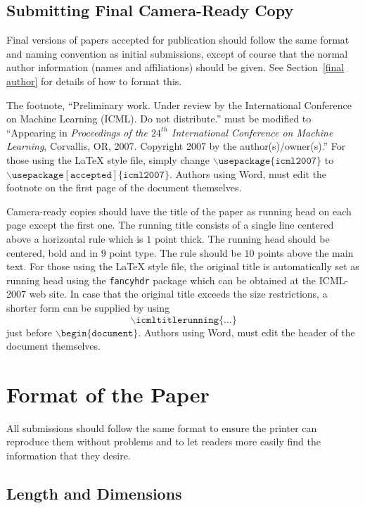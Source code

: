 \documentclass{article}
\begin{document}
\subsection{Submitting Final Camera-Ready Copy}

Final versions of papers accepted for publication should follow the same
format and naming convention as initial submissions,
except of course that the normal author information (names and affiliations)
should be given. 
See Section~\ref{final author} for details of how to format this.

The footnote,  ``Preliminary work.  Under review by the International
Conference on Machine Learning (ICML).  Do not distribute.'' must be modified
to ``Appearing in \textit{Proceedings of the $\mathit{24}^{th}$ International
Conference on Machine Learning}, Corvallis, OR, 2007.  Copyright 2007 by 
the author(s)/owner(s).''
For those using the LaTeX style file, simply change $\mathtt{\backslash usepackage\{icml2007\}}$
to $\mathtt{\backslash usepackage[accepted]\{icml2007\}}$.  
Authors using Word, must edit the footnote on the first page of the document
themselves.

Camera-ready copies should have the title of the paper as 
running head on each page except the first one. 
The running title consists of a single line centered above a horizontal rule which is $1$ point thick.
The running head should be centered, bold and in $9$ point type.
The rule should be $10$ points above the main text.
For those using the LaTeX style file, the original title is automatically set as
running head using the {\tt fancyhdr} package which can be obtained at the ICML-2007 web site. 
In case that the original title
exceeds the size restrictions, a shorter form can be supplied by using
$$\mathtt{\backslash icmltitlerunning\{\ldots\}}$$
just before $\mathtt{\backslash begin\{document\}}$.
Authors using Word, must edit the header of the document themselves.

\section{Format of the Paper} 
 
All submissions should follow the same format to ensure the printer
can reproduce them without problems and to let readers more easily
find the information that they desire. 

\subsection{Length and Dimensions}
\end{document}
